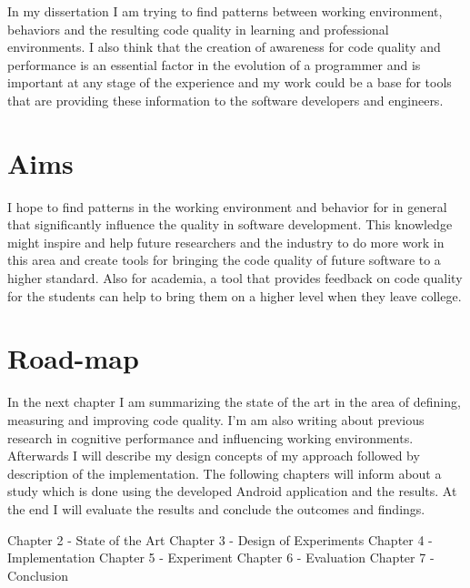 In my dissertation I am trying to find patterns between working environment, behaviors and the resulting code quality in learning and professional environments. I also think that the creation of awareness for code quality and performance is an essential factor in the evolution of a programmer and is important at any stage of the experience and my work could be a base for tools that are providing these information to the software developers and engineers. 

\section{Aims}
I hope to find patterns in the working environment and behavior for in general that significantly influence the quality in software development. 
This knowledge might inspire and help future researchers and the industry to do more work in this area and create tools for bringing the code quality of future software to a higher standard. 
Also for academia, a tool that provides feedback on code quality for the students can help to bring them on a higher level when they leave college. 

\section{Road-map}
In the next chapter I am summarizing the state of the art in the area of defining, measuring and improving code quality. I'm am also writing about previous research in cognitive performance and influencing working environments. 
Afterwards I will describe my design concepts of my approach followed by description of the implementation. 
The following chapters will inform about a study which is done using the developed Android application and the results. 
At the end I will evaluate the results and conclude the outcomes and findings. 

	Chapter 2 - State of the Art
	Chapter 3 - Design of Experiments 
	Chapter 4 - Implementation
	Chapter 5 - Experiment
	Chapter 6 - Evaluation
	Chapter 7 - Conclusion 


